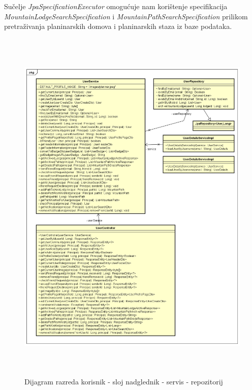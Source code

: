 			  Sučelje \textit{JpaSpecificationExecutor} omogućuje nam korištenje specifikacija \textit{MountainLodgeSearchSpecification} i \textit{MountainPathSearchSpecification} prilikom pretraživanja planinarskih domova i planinarskih staza iz baze podataka.
			\begin{figure}[H]
				\includegraphics[scale=0.6, height=175mm, width=165mm]{dijagrami/csr-user-dijagram} %
				\centering
				\caption{Dijagram razreda korisnik - sloj nadglednik - servis - repozitorij}
				\label{fig:dijagrami_razreda_korisnik}
			\end{figure}
